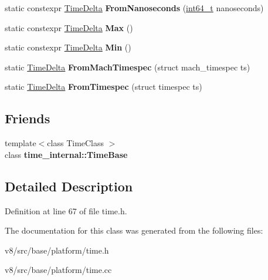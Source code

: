 \begin{DoxyCompactItemize}
static constexpr \mbox{\hyperlink{classv8_1_1base_1_1TimeDelta}{Time\+Delta}} {\bfseries From\+Nanoseconds} (\mbox{\hyperlink{classint64__t}{int64\+\_\+t}} nanoseconds)
\item 
\mbox{\label{classv8_1_1base_1_1TimeDelta_a1330af8b50fc0206f46945ea8d6922cf}} 
static constexpr \mbox{\hyperlink{classv8_1_1base_1_1TimeDelta}{Time\+Delta}} {\bfseries Max} ()
\item 
\mbox{\label{classv8_1_1base_1_1TimeDelta_a3fd6719e59fb94f03ec6a57fad48cfe9}} 
static constexpr \mbox{\hyperlink{classv8_1_1base_1_1TimeDelta}{Time\+Delta}} {\bfseries Min} ()
\item 
\mbox{\label{classv8_1_1base_1_1TimeDelta_acc527f0f013cfbb9c3e385ca412f70b6}} 
static \mbox{\hyperlink{classv8_1_1base_1_1TimeDelta}{Time\+Delta}} {\bfseries From\+Mach\+Timespec} (struct mach\+\_\+timespec ts)
\item 
\mbox{\label{classv8_1_1base_1_1TimeDelta_a8713573eefc14f286991f5ed33654571}} 
static \mbox{\hyperlink{classv8_1_1base_1_1TimeDelta}{Time\+Delta}} {\bfseries From\+Timespec} (struct timespec ts)
\end{DoxyCompactItemize}
\subsection*{Friends}
\begin{DoxyCompactItemize}
\item 
\mbox{\label{classv8_1_1base_1_1TimeDelta_ad62ea60a58e3469c74322f59c2dba4f0}} 
{\footnotesize template$<$class Time\+Class $>$ }\\class {\bfseries time\+\_\+internal\+::\+Time\+Base}
\end{DoxyCompactItemize}


\subsection{Detailed Description}


Definition at line 67 of file time.\+h.



The documentation for this class was generated from the following files\+:\begin{DoxyCompactItemize}
\item 
v8/src/base/platform/time.\+h\item 
v8/src/base/platform/time.\+cc\end{DoxyCompactItemize}

